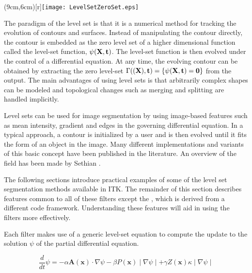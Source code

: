 %
%
% 
%
%
%



\parpic(9cm,6cm)[r]{\texttt{[image: LevelSetZeroSet.eps]}}

The paradigm of the level set is that it is a numerical method for tracking
the evolution of contours and surfaces. Instead of manipulating the contour
directly, the contour is embedded as the zero level set of a higher
dimensional function called the level-set function, $\psi(\bf{X},t)$. The
level-set function is then evolved under the control of a differential
equation.  At any time, the evolving contour can be obtained by extracting
the zero level-set $\Gamma(\bf(X),t) =
\{\psi(\bf{X},t) = 0\}$ from the output.  The main advantages of using level
sets is that arbitrarily complex shapes can be modeled and topological
changes such as merging and splitting are handled implicitly. 

Level sets can be used for image segmentation by using image-based features
such as mean intensity, gradient and edges in the governing differential
equation.  In a typical approach, a contour is initialized by a user and is
then evolved until it fits the form of an object in the image.
Many different implementations and variants of this basic concept have been
published in the literature. An overview of the field has been made by
Sethian \cite{Sethian1996}.

The following sections introduce practical examples of some
of the level set segmentation methods available in ITK.  The remainder of this
section describes features common to all of these filters except the
, which is derived from a different code
framework.  Understanding these features will aid in using the filters
more effectively.

Each filter makes use of a generic level-set equation to compute the update to
the solution $\psi$ of the partial differential equation.

\begin{equation}
\label{eqn:LevelSetEquation}
\frac{d}{dt}\psi = -\alpha \mathbf{A}(\mathbf{x})\cdot\nabla\psi - \beta
  P(\mathbf{x})\mid\nabla\psi\mid + 
\gamma Z(\mathbf{x})\kappa\mid\nabla\psi\mid
\end{equation}
 

